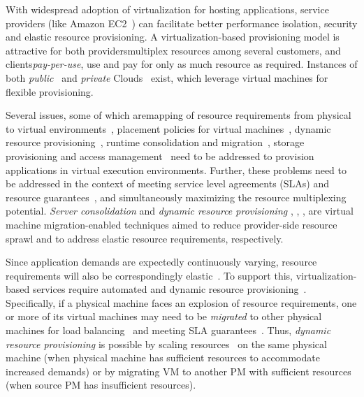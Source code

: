 

With widespread adoption of virtualization 
for hosting applications,
service providers (like Amazon EC2~\cite{ec2}) can facilitate better 
performance isolation, security and elastic resource provisioning.
A virtualization-based provisioning model is attractive for both 
providers\textemdash{}multiplex resources among several customers, and 
clients\textemdash{}\textit{pay-per-use}, use and pay for only as much resource 
as required. Instances of both 
\emph{public}~\cite{ec2} and \emph{private}
Clouds~\cite{ubuntu-private-cloud, ubuntu-cloud-tools} 
exist, which leverage 
virtual machines
for flexible provisioning.

Several issues, some of which are\textemdash{}mapping of 
resource requirements
from physical to virtual environments~\cite{profiling-and-modeling},
placement policies for virtual machines~\cite{autonomic-vm-placement},
dynamic resource provisioning~\cite{autonomic-virtual-resource-management},
runtime consolidation and migration~\cite{sandpiper},
storage provisioning and access management~\cite{ip-networked-storage}
need to be addressed to provision applications in virtual execution
environments. Further, these problems
need to be addressed in the context of meeting service level
agreements (SLAs)
and resource guarantees~\cite{managing-sla-violations},
and simultaneously maximizing the resource multiplexing potential.
\textit{Server consolidation} and 
\textit{dynamic resource provisioning} 
\cite{autonomic-vm-placement}, \cite{autonomic-virtual-resource-management}, 
\cite{sandpiper}, \cite{capacity-management} are
virtual machine migration-enabled 
techniques aimed to reduce provider-side
resource sprawl and to address elastic 
resource requirements, respectively.

Since application demands are expectedly continuously varying, resource
requirements will also be correspondingly elastic~\cite{ec2}. To support this,
virtualization-based services require automated and dynamic resource
provisioning~\cite{sandpiper}.
Specifically, if a physical machine faces an explosion of resource
requirements, one or more of its 
virtual machines may need to be
\textit{migrated} to other physical machines for load 
balancing~\cite{entropy, load-balancing} and 
meeting SLA guarantees~\cite{managing-sla-violations}. 
Thus, \textit{dynamic resource provisioning} is possible by 
scaling resources~\cite{smartscale} on the same physical
machine (when physical machine
has sufficient resources to accommodate increased demands)
or by migrating VM to 
another PM with 
sufficient resources (when source PM has 
insufficient resources).

